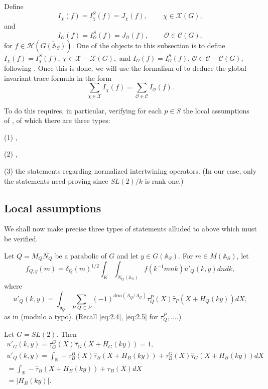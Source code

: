 Define 
\begin{equation}\label{eq:6.2}
I_\chi (f)=I_\chi ^S(f)=J_\chi (f),\;\;\;\;\;\;\;\;\chi \in {\mathcal{X}}(G),
\end{equation}
and 
\begin{equation}\label{eq:6.3}
I_{{\mathcal{O}}}(f)=I_{{\mathcal{O}}}^S(f)=J_{{\mathcal{O}}}(f),
\;\;\;\;\;\;\;\;{\mathcal{O}}\in {\mathcal C}(G),
\end{equation}
for $f\in {\mathcal{H}}(\overline{G({\mathbb{A}}_S)})$. One of the objects to this subsection
is to define $I_\chi (f)=I_\chi ^S(f)$,
$\chi \in {\mathcal{X}}-{\mathcal{X}}(G), $
and $I_{{\mathcal{O}}}(f)=I_{{\mathcal{O}}}^S(f)$,
${\mathcal{O}}\in {\mathcal C}-{\mathcal C}(G),\;$%
following \cite{A6}. Once this is done, we will use the formalism of \cite{A6} to
deduce the global invariant trace formula in the form 
\begin{equation}\label{eq:6.4}
\sum_{\chi \in {\mathcal{X}}}I_\chi (f)=\sum_{{\mathcal{O}}\in {\mathcal C}}
I_{{\mathcal{O}}}(f).
\end{equation}

To do this requires, in particular, verifying for each $p\in S$ the local
assumptions of \cite{A6}, of which there are three types:

(1) \cite[Assumption 5.1, p. 30]{A6},

(2) \cite[Assumption 5.2, p. 32]{A6},

(3) the statements \cite[(7.1)--(7.6)]{A6} regarding normalized intertwining operators.
(In our case, only the statements \cite[(7.1)--(7.4)]{A6} need proving since
$SL(2)/k$ is rank one.)

\subsection{Local assumptions}\label{ssec:localass}

We shall now make precise three types of statements alluded to
above which must be verified.

Let $Q=M_Q N_Q$ be a parabolic of $G$ and let $y\in G({\mathbb{A}}_S)$.
For $m\in M({\mathbb{A}}_S)$, let
\begin{equation}\label{eq:6.5}
f_{Q,y}(m)=\delta_Q(m)^{1/2}\int_K\int_{N_Q({\mathbb{A}}_S)}
f(k^{-1}mnk)u'_Q(k,y)dndk,
\end{equation}
where
\[
u'_Q(k,y)=\int_{{\mathfrak{a}}_Q}
\sum_{ P ,Q\subset P}
(-1)^{dim(A_Q/A_G)}
\tau_Q^P(X)\hat{\tau}_P(X+H_Q(ky))dX ,
\]
as in \cite[{3.3}]{A6} (modulo a typo).
(Recall \eqref{eq:2.4}, \eqref{eq:2.5} for $\tau_Q^P,...$.)
\begin{example}\label{ex:6.1} Let $G=SL(2)$. Then
\[
\begin{array}{c}
u'_G(k,y)=\tau_G^G(X)\hat{\tau}_G(X+H_G(ky))=1,\\
u'_Q(k,y)=\int_{{\mathbb{R}}}
-\tau_B^B(X)\hat{\tau}_B(X+H_B(ky))
+\tau_B^G(X)\hat{\tau}_G(X+H_B(ky)) dX \\
=\int_{{\mathbb{R}}}
-\hat{\tau}_B(X+H_B(ky))+\tau_B(X)dX\\
=|H_B(ky)|.
\end{array}
\]
\end{example}

